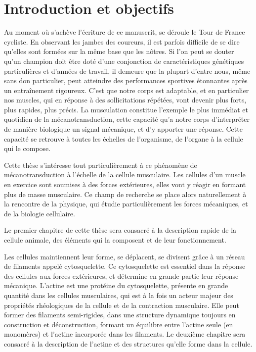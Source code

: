 %
%
%
%

\chapter*{Introduction et objectifs}
  Au moment où s'achève l'écriture de ce manuscrit, se déroule le Tour de France cycliste. En observant les jambes des coureurs, il est parfois difficile de se dire qu'elles sont formées sur la même base que les nôtres. Si l'on peut se douter qu'un champion doit être doté d'une conjonction de caractéristiques génétiques particulières et d'années de travail, il demeure que la plupart d'entre nous, même sans don particulier, peut atteindre des performances sportives étonnantes après un entraînement rigoureux. C'est que notre corps est adaptable, et en particulier nos muscles, qui en réponse à des sollicitations répétées, vont devenir plus forts, plus rapides, plus précis. La musculation constitue l'exemple le plus immédiat et quotidien de la mécanotransduction, cette capacité qu'a notre corps d'interpréter de manière biologique un signal mécanique, et d'y apporter une réponse. Cette capacité se retrouve à toutes les échelles de l'organisme, de l'organe à la cellule qui le compose. 
  
  Cette thèse s'intéresse tout particulièrement à ce phénomène de mécanotransduction à l'échelle de la cellule musculaire. Les cellules d'un muscle en exercice sont soumises à des forces extérieures, elles vont y réagir en formant plus de masse musculaire. Ce champ de recherche se place alors naturellement à la rencontre de la physique, qui étudie particulièrement les forces mécaniques, et de la biologie cellulaire. 
  
  Le premier chapitre de cette thèse sera consacré à la description rapide de la cellule animale, des éléments qui la composent et de leur fonctionnement. 

	Les cellules maintiennent leur forme, se déplacent, se divisent grâce à un réseau de filaments appelé cytosquelette. Ce cytosquelette est essentiel dans la réponse des cellules aux forces extérieures, et détermine en grande partie leur réponse mécanique. L'actine est une protéine du cytosquelette, présente en grande quantité dans les cellules musculaires, qui est à la fois un acteur majeur des propriétés rhéologiques de la cellule et de la contraction musculaire. Elle peut former des filaments semi-rigides, dans une structure dynamique toujours en construction et déconstruction, formant un équilibre entre l'actine seule (en monomères) et l'actine incorporée dans les filaments.  Le deuxième chapitre sera consacré à la description de l'actine et des structures qu'elle forme dans la cellule. 

